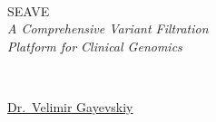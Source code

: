 %
%
%
% 
%
%
%

\begin{titlepage} %

	\centering %
	
	
	\setlength{\unitlength}{0.7\textwidth} %
	
	{}\\[\baselineskip] %
	
	{\fontsize{60pt}{60pt}\selectfont SEAVE}\\[\baselineskip] %
	
	{\Large\textit{A Comprehensive Variant Filtration\\ Platform for Clinical Genomics}}\\ %
	
	{} %
	
	\vfill %
	
	
	{\Large\textbf{\MakeUppercase{\titlepageguidename}}}\\
	
	{\large\version}
	
	\vfill
	
	
	\href{https://www.vel.nz}{Dr.~Velimir Gayevskiy}

\end{titlepage}

